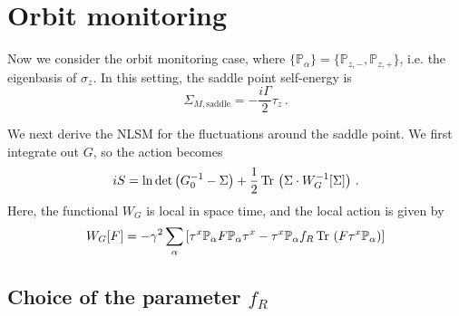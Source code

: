 \documentclass[aps,prx,preprint,amsmath,amssymb]{revtex4-2}
\newcommand{\Tr}{{\rm \, Tr\,}}
\begin{document}
\section{Orbit monitoring}

  Now we consider the orbit monitoring case, where $\{\mathbb{P}_\alpha\}=\{\mathbb{P}_{z,-},\mathbb{P}_{z,+}\}$, i.e. the eigenbasis of $\sigma_z$. In this setting, the saddle point self-energy is 
\begin{equation}\label{}
  \Sigma_{M,\text{saddle}}=-\frac{i \Gamma}{2}\tau_z\,.
\end{equation}

  We next derive the NLSM for the fluctuations around the saddle point. We first integrate out $G$, so the action becomes 
\begin{equation}\label{}
  i S = \ln \det\left(G_0^{-1}-\Sigma\right)+\frac{1}{2}\Tr\left(\Sigma\cdot  W_G^{-1}[\Sigma]\right)\,.
\end{equation} Here, the functional $W_G$ is local in space time, and the local action is given by 
\begin{equation}\label{}
  W_G[F]=-\gamma^2 \sum_{\alpha}\left[\tau^x \mathbb{P}_\alpha F \mathbb{P}_\alpha \tau^x-\tau^x \mathbb{P}_\alpha f_R \Tr\left(F \tau^x \mathbb{P}_\alpha\right)\right]
\end{equation}

\subsection{Choice of the parameter $f_R$}
\end{document}
